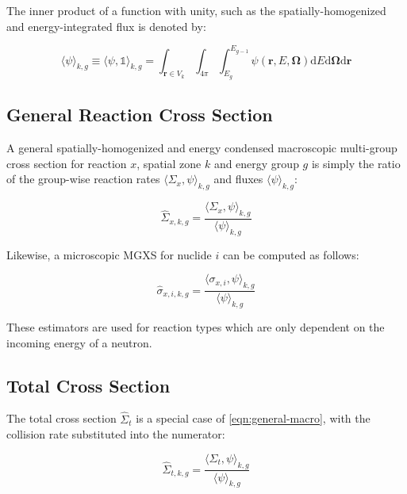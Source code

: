 \noindent The inner product of a function with unity, such as the spatially-homogenized and energy-integrated flux is denoted by:

\begin{equation}
\label{eqn:angle-flux}
\langle \psi \rangle_{k,g} \equiv \langle \psi, \mathbb{1} \rangle_{k,g} = \int_{\mathbf{r} \in V_{k}} \int_{4\pi} \int_{E_{g}}^{E_{g-1}} \psi(\mathbf{r},E,\mathbf{\Omega}) \mathrm{d}E\mathrm{d}\mathbf{\Omega}\mathrm{d}\mathbf{r}
\end{equation}

\subsection{General Reaction Cross Section}
\label{subsubsec:tally-types-gen-xs}

A general spatially-homogenized and energy condensed macroscopic multi-group cross section for reaction $x$, spatial zone $k$ and energy group $g$ is simply the ratio of the group-wise reaction rates $\langle \Sigma_{x}, \psi \rangle_{k,g}$ and fluxes $\langle \psi \rangle_{k,g}$:

\begin{equation}
\label{eqn:general-macro}
\hat{\Sigma}_{x,k,g} = \frac{\langle \Sigma_{x}, \psi \rangle_{k,g}}{\langle \psi \rangle_{k,g}}
\end{equation}

\noindent Likewise, a microscopic MGXS for nuclide $i$ can be computed as follows:

\begin{equation}
\label{eqn:general-micro}
\hat{\sigma}_{x,i,k,g} = \frac{\langle \sigma_{x,i}, \psi \rangle_{k,g}}{\langle \psi \rangle_{k,g}}
\end{equation}

\noindent These estimators are used for reaction types which are only dependent on the incoming energy of a neutron.

\subsection{Total Cross Section}
\label{subsubsec:tally-types-tot-xs}

The total cross section $\hat{\Sigma}_{t}$ is a special case of \autoref{eqn:general-macro}, with the collision rate substituted into the numerator:

\begin{equation}
\label{eqn:total-macro}
\hat{\Sigma}_{t,k,g} = \frac{\langle \Sigma_{t}, \psi \rangle_{k,g}}{\langle \psi \rangle_{k,g}}
\end{equation}

